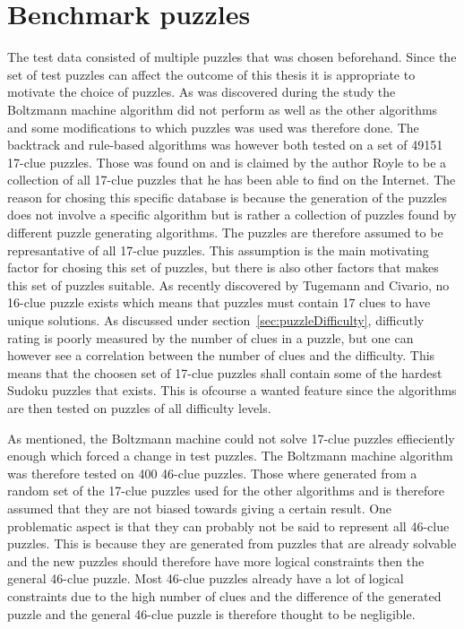 \documentclass[a4paper,11pt]{kth-mag}
\begin{document}
\FloatBarrier
\section{Benchmark puzzles}
\label{sec:benchmarkPuzzles}
The test data consisted of multiple puzzles that was chosen beforehand.
Since the set of test puzzles can affect the outcome of this thesis it is appropriate to motivate the choice of puzzles.
As was discovered during the study the Boltzmann machine algorithm did not perform as well as the other algorithms and some modifications to which puzzles was used was therefore done.
The backtrack and rule-based algorithms was however both tested on a set of 49151 17-clue puzzles. 
Those was found on \cite{database} and is claimed by the author Royle to be a collection of all 17-clue puzzles that he has been able to find on the Internet. 
The reason for chosing this specific database is because the generation of the puzzles does not involve a specific algorithm but is rather a collection of puzzles found by different puzzle generating algorithms.  
The puzzles are therefore assumed to be represantative of all 17-clue puzzles. 
This assumption is the main motivating factor for chosing this set of puzzles, but there is also other factors that makes this set of puzzles suitable. 
As recently discovered by Tugemann and Civario, no 16-clue puzzle exists which means that puzzles must contain 17 clues to have unique solutions.\cite{17clueProof}  
\label{sec:puzzleDifficulty}
As discussed under section~\ref{sec:puzzleDifficulty}, difficutly rating is poorly measured by the number of clues in a puzzle, but one can however see a correlation between the number of clues and the difficulty.\cite{difficulty}
This means that the choosen set of 17-clue puzzles shall contain some of the hardest Sudoku puzzles that exists.
This is ofcourse a wanted feature since the algorithms are then tested on puzzles of all difficulty levels.

As mentioned, the Boltzmann machine could not solve 17-clue puzzles effieciently enough which forced a change in test puzzles. The Boltzmann machine algorithm was therefore tested on 400 46-clue puzzles. Those where generated from a random set of the 17-clue puzzles used for the other algorithms and is therefore assumed that they are not biased towards giving a certain result.
One problematic aspect is that they can probably not be said to represent all 46-clue puzzles.
This is because they are generated from puzzles that are already solvable and the new puzzles should therefore have more logical constraints then the general 46-clue puzzle.
Most 46-clue puzzles already have a lot of logical constraints due to the high number of clues and the difference of the generated puzzle and the general 46-clue puzzle is therefore thought to be negligible.
\FloatBarrier
\end{document}
